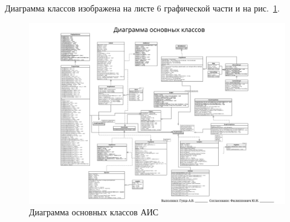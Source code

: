 \documentclass[russian,utf8,emptystyle]{eskdtext}
\begin{document}
\begin{spacing}{1.5}
Диаграмма классов изображена на листе 6 графической части и на рис.~\ref{fig:classDiagram}.

\begin{figure}[h!]
\centering
\includegraphics[width=1.3\textwidth, angle=90]{list6}
\caption{Диаграмма основных классов АИС}
\label{fig:classDiagram}
\end{figure}


\end{spacing}
\end{document}
